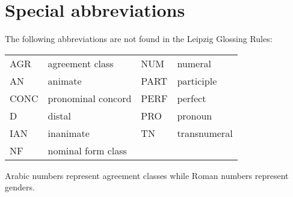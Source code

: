 \documentclass[output=collectionpaper]{langsci/langscibook}
\begin{document}
\section*{Special abbreviations}

\noindent The following abbreviations are not found in the Leipzig Glossing Rules:
\medskip

\begin{tabular}{llll}
AGR 	&	 agreement class 	&	NUM 	&	  numeral	\\
AN  	&	 animate & PART 	&	  participle	\\
CONC  	&	 pronominal concord &	PERF  	&	 perfect	\\
D 	&	  distal 	&	PRO  	&	 pronoun	\\
IAN  	&	 inanimate &	TN 	&	  transnumeral	\\
 NF 	&	  nominal form class && \\

\end{tabular}
\medskip

\noindent Arabic numbers represent agreement classes while Roman numbers represent genders.


\printbibliography[heading=subbibliography,notkeyword=this]
\end{document}
